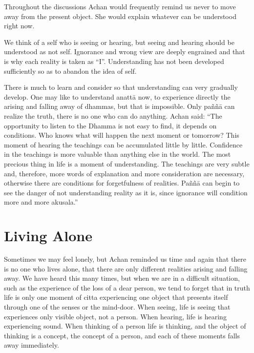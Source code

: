 Throughout the discussions  Achan would frequently remind us never to move away 
from the present object. She would explain whatever can be understood right now. 

We think of a self who is seeing or hearing, but seeing and hearing should be understood as not self. Ignorance and wrong view are deeply engrained and that is why 
each reality is taken as ``I''. Understanding has not been developed sufficiently so as 
to abandon the idea of self. 

There is much to learn and consider so that understanding can very gradually develop. One may like to understand anattā now, to experience directly the arising and 
falling away of dhammas, but that is impossible. Only paññā can realize the truth, 
there is no one who can do anything.  Achan said: ``The opportunity to listen to the 
Dhamma is not easy to find, it depends on conditions. Who knows what will happen 
the next moment or tomorrow? This moment of hearing the teachings can be accumulated little by little. Confidence in the teachings is more valuable than anything else 
in the world. The most precious thing in life is a moment of understanding. The 
teachings are very subtle and, therefore, more words of explanation and more consideration are necessary, otherwise there are conditions for forgetfulness of realities. 
Paññā can begin to see the danger of not understanding reality as it is, since ignorance will condition more and more akusala.'' 



\chapter{Living Alone} 




Sometimes we may feel lonely, but  Achan reminded us time and again that there is 
no one who lives alone, that there are only different realities arising and falling away. 
We have heard this many times, but when we are in a difficult situation, such as the 
experience of the loss of a dear person, we tend to forget that in truth life is only one 
moment of citta experiencing one object that presents itself through one of the senses 
or the mind-door. When seeing, life is seeing that experiences only visible object, not 
a person. When hearing, life is hearing experiencing sound. When thinking of a person life is thinking, and the object of thinking is a concept, the concept of a person, 
and each of these moments falls away immediately. 


